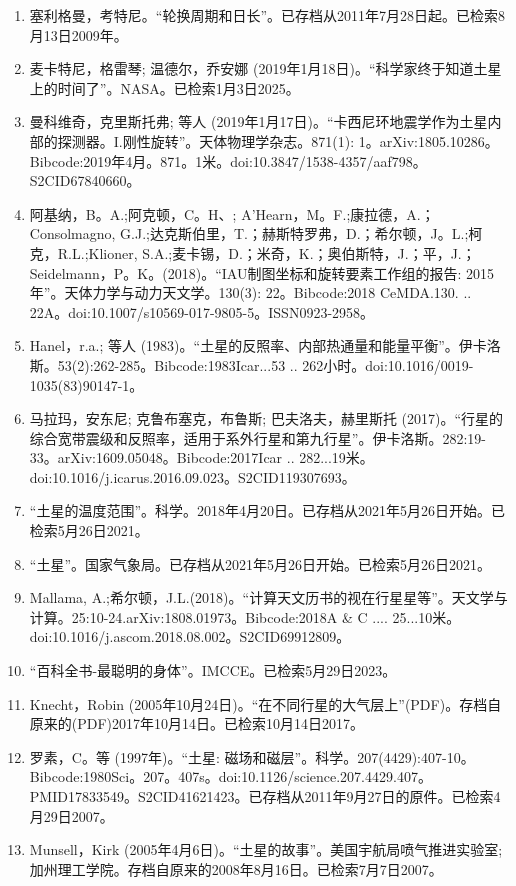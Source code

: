 \begin{enumerate}
\item 塞利格曼，考特尼。“轮换周期和日长”。已存档从2011年7月28日起。已检索8月13日2009年。
\item 麦卡特尼，格雷琴; 温德尔，乔安娜 (2019年1月18日)。“科学家终于知道土星上的时间了”。NASA。已检索1月3日2025。
\item 曼科维奇，克里斯托弗; 等人 (2019年1月17日)。“卡西尼环地震学作为土星内部的探测器。I.刚性旋转”。天体物理学杂志。871(1): 1。arXiv:1805.10286。Bibcode:2019年4月。871。1米。doi:10.3847/1538-4357/aaf798。S2CID67840660。 
\item 阿基纳，B。A.;阿克顿，C。H、; A'Hearn，M。F.;康拉德，A.；Consolmagno, G.J.;达克斯伯里，T.；赫斯特罗弗，D.；希尔顿，J。L.;柯克，R.L.;Klioner, S.A.;麦卡锡，D.；米奇，K.；奥伯斯特，J.；平，J.；Seidelmann，P。K。(2018)。“IAU制图坐标和旋转要素工作组的报告: 2015年”。天体力学与动力天文学。130(3): 22。Bibcode:2018 CeMDA.130. .. 22A。doi:10.1007/s10569-017-9805-5。ISSN0923-2958。 
\item Hanel，r.a.; 等人 (1983)。“土星的反照率、内部热通量和能量平衡”。伊卡洛斯。53(2):262-285。Bibcode:1983Icar...53 .. 262小时。doi:10.1016/0019-1035(83)90147-1。
\item 马拉玛，安东尼; 克鲁布塞克，布鲁斯; 巴夫洛夫，赫里斯托 (2017)。“行星的综合宽带震级和反照率，适用于系外行星和第九行星”。伊卡洛斯。282:19-33。arXiv:1609.05048。Bibcode:2017Icar .. 282...19米。doi:10.1016/j.icarus.2016.09.023。S2CID119307693。 
\item “土星的温度范围”。科学。2018年4月20日。已存档从2021年5月26日开始。已检索5月26日2021。
\item “土星”。国家气象局。已存档从2021年5月26日开始。已检索5月26日2021。
\item Mallama, A.;希尔顿，J.L.(2018)。“计算天文历书的视在行星星等”。天文学与计算。25:10-24.arXiv:1808.01973。Bibcode:2018A & C .... 25...10米。doi:10.1016/j.ascom.2018.08.002。S2CID69912809。 
\item “百科全书-最聪明的身体”。IMCCE。已检索5月29日2023。
\item Knecht，Robin (2005年10月24日)。“在不同行星的大气层上”(PDF)。存档自原来的(PDF)2017年10月14日。已检索10月14日2017。
\item 罗素，C。等 (1997年)。“土星: 磁场和磁层”。科学。207(4429):407-10。Bibcode:1980Sci。207。407s。doi:10.1126/science.207.4429.407。PMID17833549。S2CID41621423。已存档从2011年9月27日的原件。已检索4月29日2007。  
\item Munsell，Kirk (2005年4月6日)。“土星的故事”。美国宇航局喷气推进实验室; 加州理工学院。存档自原来的2008年8月16日。已检索7月7日2007。

\end{enumerate}
